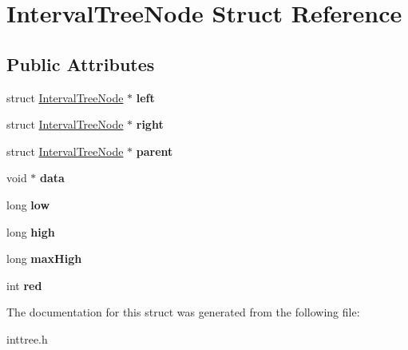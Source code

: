 \hypertarget{struct_interval_tree_node}{\section{Interval\-Tree\-Node Struct Reference}
\label{struct_interval_tree_node}
}
\subsection*{Public Attributes}
\begin{DoxyCompactItemize}
\item 
\hypertarget{struct_interval_tree_node_a1e81548b6a6ddc6353a82fc141c4cc7d}{struct \hyperlink{struct_interval_tree_node}{Interval\-Tree\-Node} $\ast$ {\bfseries left}}\label{struct_interval_tree_node_a1e81548b6a6ddc6353a82fc141c4cc7d}

\item 
\hypertarget{struct_interval_tree_node_a8f8e6b60add3af4432b7c6fea1207fd3}{struct \hyperlink{struct_interval_tree_node}{Interval\-Tree\-Node} $\ast$ {\bfseries right}}\label{struct_interval_tree_node_a8f8e6b60add3af4432b7c6fea1207fd3}

\item 
\hypertarget{struct_interval_tree_node_ae5cc12ea1024cbd093cfa05f6e060d2d}{struct \hyperlink{struct_interval_tree_node}{Interval\-Tree\-Node} $\ast$ {\bfseries parent}}\label{struct_interval_tree_node_ae5cc12ea1024cbd093cfa05f6e060d2d}

\item 
\hypertarget{struct_interval_tree_node_a7900b560246295eff1324b8d361a92ae}{void $\ast$ {\bfseries data}}\label{struct_interval_tree_node_a7900b560246295eff1324b8d361a92ae}

\item 
\hypertarget{struct_interval_tree_node_af4b8e953cd34bb7c3ee717f4f8915385}{long {\bfseries low}}\label{struct_interval_tree_node_af4b8e953cd34bb7c3ee717f4f8915385}

\item 
\hypertarget{struct_interval_tree_node_a48170e3a2b117cd31d6a5dacdc8a3205}{long {\bfseries high}}\label{struct_interval_tree_node_a48170e3a2b117cd31d6a5dacdc8a3205}

\item 
\hypertarget{struct_interval_tree_node_abf5c10dc3a17632d29f8f76927893f6e}{long {\bfseries max\-High}}\label{struct_interval_tree_node_abf5c10dc3a17632d29f8f76927893f6e}

\item 
\hypertarget{struct_interval_tree_node_a26f88793e1ef6b5471a72fd24af93bb2}{int {\bfseries red}}\label{struct_interval_tree_node_a26f88793e1ef6b5471a72fd24af93bb2}

\end{DoxyCompactItemize}


The documentation for this struct was generated from the following file\-:\begin{DoxyCompactItemize}
\item 
inttree.\-h\end{DoxyCompactItemize}
